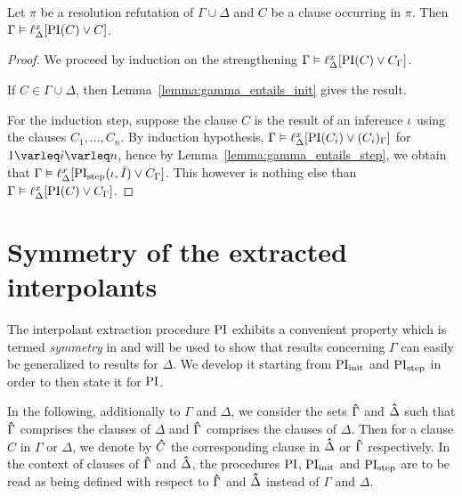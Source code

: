 \begin{lemma}
	\label{lemma:gamma_entails_lifted_interpolant}
	Let $\pi$ be a resolution refutation of $\Gamma \cup \Delta$ and $C$ be a clause occurring in $\pi$.
	Then $\Gamma \entails \lifdelta{\PI(C) \lor\nolinebreak C}$.
\end{lemma}
\begin{proof}
	We proceed by induction on the strengthening
	$\Gamma \entails \lifdelta{\PI(C) \lor\nolinebreak C_\Gamma}$.

	If $C \in \Gamma\cup\Delta$, then Lemma~\ref{lemma:gamma_entails_init} gives the result.

	For the induction step, suppose the clause $C$ is the result of an inference $\iota$ using the clauses $C_1, \dots, C_n$.
	By induction hypothesis, $\Gamma \entails \lifdelta{\PI(C_i) \lor\nolinebreak (C_i)_\Gamma}$ for $1\varleq i\varleq n$, hence
	by Lemma~\ref{lemma:gamma_entails_step}, we obtain that 
	$\Gamma \vDash \ell_{\Delta}^{x}[\operatorname{PI}_{\mathrm{step}}(\iota, \bar I) \lor C_\Gamma]$.
	This however is nothing else than $\Gamma \vDash \ell_{\Delta}^{x}[\operatorname{PI}(C) \lor C_\Gamma]$.
\end{proof}




\section{Symmetry of the extracted interpolants}
\label{sec:symmetry}

The interpolant extraction procedure $\operatorname{PI}$ exhibits a convenient property which is termed \emph{symmetry} in \cite[Definition 3]{interpolantStrenth} and will be used to show that results concerning $\Gamma$ can easily be generalized to results for $\Delta$.
We develop it starting from $\operatorname{PI}_{\mathrm{init}}$ and $\operatorname{PI}_{\mathrm{step}}$ in order to then state it for $\operatorname{PI}$. 

\newcommand{\primex}[1]{\ensuremath{\bhat{#1}}}

In the following, additionally to $\Gamma$ and $\Delta$, we consider the sets $\primex{\Gamma}$ and $\primex{\Delta}$ such that $\primex{\Gamma}$ comprises the clauses of $\Delta$ and $\primex{\Gamma}$ comprises the clauses of $\Delta$. 
Then for a clause $C$ in $\Gamma$ or $\Delta$, we denote by $\primex C$ the corresponding clause in $\primex \Delta$ or $\primex \Gamma$ respectively.
In the context of clauses of $\primex \Gamma$ and $\primex \Delta$, the procedures $\operatorname{PI}$, $\operatorname{PI}_{\mathrm{init}}$ and $\operatorname{PI}_{\mathrm{step}}$ are to be read as being defined with respect to $\primex \Gamma$ and $\primex \Delta$ instead of $\Gamma$ and $\Delta$.



